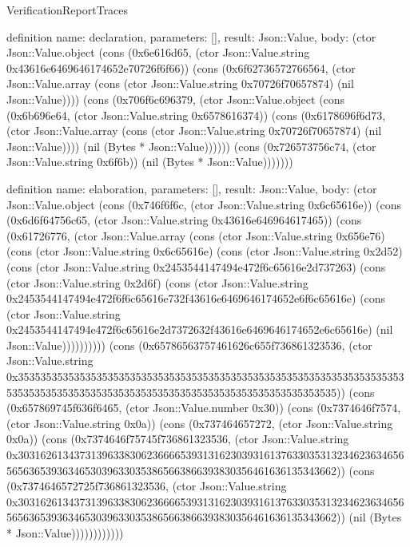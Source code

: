 \begin{lexlean}{VerificationReportTraces}
\begin{semanticmodule}
definition{
  name: declaration,
  parameters: [],
  result: Json::Value,
  body: (ctor Json::Value.object (cons (0x6e616d65, (ctor Json::Value.string 0x43616e6469646174652e70726f6f66)) (cons (0x6f62736572766564, (ctor Json::Value.array (cons (ctor Json::Value.string 0x70726f70657874) (nil Json::Value)))) (cons (0x706f6c696379, (ctor Json::Value.object (cons (0x6b696e64, (ctor Json::Value.string 0x6578616374)) (cons (0x6178696f6d73, (ctor Json::Value.array (cons (ctor Json::Value.string 0x70726f70657874) (nil Json::Value)))) (nil (Bytes * Json::Value)))))) (cons (0x726573756c74, (ctor Json::Value.string 0x6f6b)) (nil (Bytes * Json::Value)))))))
}

definition{
  name: elaboration,
  parameters: [],
  result: Json::Value,
  body: (ctor Json::Value.object (cons (0x746f6f6c, (ctor Json::Value.string 0x6c65616e)) (cons (0x6d6f64756c65, (ctor Json::Value.string 0x43616e646964617465)) (cons (0x61726776, (ctor Json::Value.array (cons (ctor Json::Value.string 0x656e76) (cons (ctor Json::Value.string 0x6c65616e) (cons (ctor Json::Value.string 0x2d52) (cons (ctor Json::Value.string 0x2453544147494e472f6c65616e2d737263) (cons (ctor Json::Value.string 0x2d6f) (cons (ctor Json::Value.string 0x2453544147494e472f6f6c65616e732f43616e6469646174652e6f6c65616e) (cons (ctor Json::Value.string 0x2453544147494e472f6c65616e2d7372632f43616e6469646174652e6c65616e) (nil Json::Value)))))))))) (cons (0x65786563757461626c655f736861323536, (ctor Json::Value.string 0x35353535353535353535353535353535353535353535353535353535353535353535353535353535353535353535353535353535353535353535353535353535)) (cons (0x657869745f636f6465, (ctor Json::Value.number 0x30)) (cons (0x7374646f7574, (ctor Json::Value.string 0x0a)) (cons (0x737464657272, (ctor Json::Value.string 0x0a)) (cons (0x7374646f75745f736861323536, (ctor Json::Value.string 0x30316261343731396338306236666539313162303931613763303531323462363465656563653936346530396330353865663866393830356461636135343662)) (cons (0x7374646572725f736861323536, (ctor Json::Value.string 0x30316261343731396338306236666539313162303931613763303531323462363465656563653936346530396330353865663866393830356461636135343662)) (nil (Bytes * Json::Value))))))))))))
}


\end{semanticmodule}
\end{lexlean}

